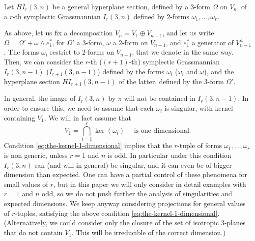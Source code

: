 Let $HI_r(3,n)$ be a general hyperplane
section, defined by a 3-form $\Omega$ on $V_n$, of a $r$-th symplectic Grassmannian $I_r(3,n)$ defined by $2$-forms $\omega_1,\ldots,\omega_r$.

As above, let us fix a decomposition $V_n=V_1 \oplus V_{n-1}$, and let us write
$\Omega = \Omega' + \omega \wedge e_1^*$, for $\Omega'$ a $3$-form, $\omega$ a $2$-form on $V_{n-1}$, and $e_1^*$ a generator of $V_{n-1}^\perp$.
The forms $\omega_i$ restrict to $2$-forms on $V_{n-1}$, that we denote in the same way.
Then, we can consider the $r$-th (\resp $(r+1)$-th) symplectic Grassmannian $I_r(3,n-1)$ (\resp $I_{r+1}(3,n-1)$) defined by the forms $\omega_i$ (\resp $\omega_i$ and $\omega$), and the hyperplane section $HI_{r+1}(3,n-1)$ of the latter, defined by the $3$-form $\Omega'$.

In general, the image of $I_r(3,n)$ by $\pi$ will not be contained in $I_r(3,n-1)$. In order
to ensure this, we need to assume that each $\omega_i$ is singular, with kernel containing $V_1$.
We will in fact assume that
\begin{equation}\label{eq:the-kernel-1-dimensional}
V_1 = \bigcap_{i=1}^r \ker(\omega_i) \quad \text{ is one-dimensional.}
\end{equation}
Condition \eqref{eq:the-kernel-1-dimensional} implies that the $r$-tuple of
forms $\omega_1,\ldots ,\omega_r$ is non generic,
unless $r=1$ and $n$ is odd.
In particular under this condition $I_r(3,n)$ can (and will in general) be singular,
and it can even be of bigger dimension than expected. One can have a
partial control of these phenomena for small values of $r$, but in this paper we will only
consider in detail examples with $r=1$ and $n$ odd, so we do not push further the analysis of singularities and expected dimensions. We keep anyway considering projections for general values of $r$-tuples,
satisfying the above condition \eqref{eq:the-kernel-1-dimensional}.
(Alternatively, we could consider only the closure of the set of isotropic
$3$-planes that do not contain $V_1$. This will be irreducible of the correct dimension.)

